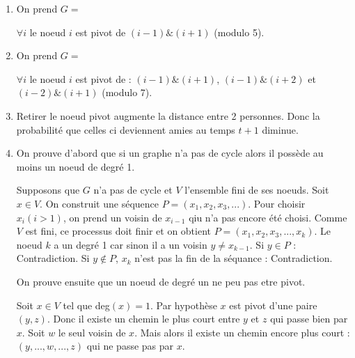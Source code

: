 \begin{enumerate}
	\item On prend $G = $
\begin{center}  
\end{center}
$\forall i$ le noeud $i$ est pivot de $(i-1)\&(i+1)$ (modulo 5).

	\item On prend $G = $
\begin{center}  
\end{center}

$\forall i$ le noeud $i$ est pivot de : 
$(i-1) \& (i+1)$, $(i-1) \& (i+2)$ et $(i-2) \& (i+1)$ 
(modulo 7).
	\item Retirer le noeud pivot augmente la distance entre 2 personnes. Donc la probabilité que celles ci deviennent amies au temps $t+1$ diminue.

	\item On prouve d'abord que si un graphe n'a pas de cycle alors il possède au moins un noeud de degré 1.

Supposons que $G$ n'a pas de cycle et $V$ l'ensemble fini de ses noeuds.
Soit $x \in V$. On construit une séquence $P = (x_1, x_2, x_3, ...)$. Pour choisir $x_i (i>1)$, on prend un voisin de $x_{i-1}$ qiu n'a pas encore été choisi. Comme $V$ est fini, ce processus doit finir et on obtient $P= (x_1, x_2, x_3,...,x_k)$. 
Le noeud $k$ a un degré 1 car sinon il a un voisin $y\neq x_{k-1}$. Si $y \in P$ : Contradiction.
Si $y \notin P$, $x_k$ n'est pas la fin de la séquance : Contradiction.

On prouve ensuite que un noeud de degré un ne peu pas etre pivot.

Soit $x\in V$ tel que deg$(x)=1$.
Par hypothèse $x$ est pivot d'une paire $(y,z)$.
Donc il existe un chemin le plus court entre $y$ et $z$ qui passe bien par $x$.
Soit $w$ le seul voisin de $x$.
Mais alors il existe un chemin encore plus court : $(y, ..., w,...,z)$ qui ne passe pas par $x$.


\end{enumerate}
